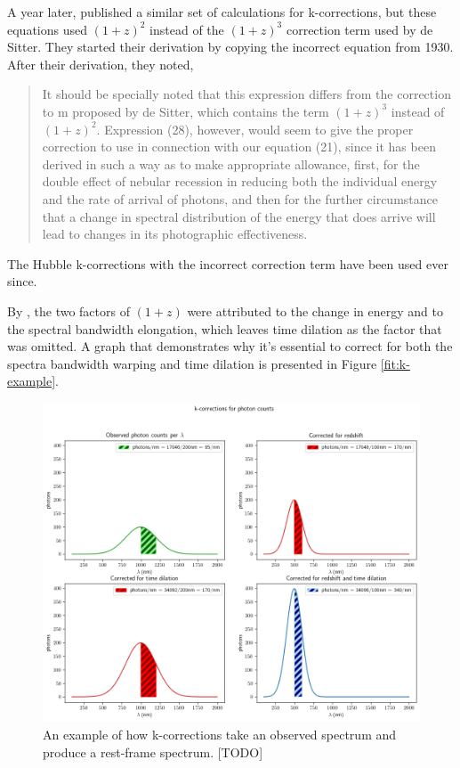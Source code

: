 \documentclass{article}
\begin{document}
A year later, \citet{hubble1935} published a similar set of calculations for
k-corrections, but these equations used $(1 + z)^2$ instead of the $(1 + z)^3$
correction term used by de Sitter. They started their derivation by copying the
incorrect equation from 1930. After their derivation, they noted,

\begin{quote}
It should be specially noted that this expression differs from the correction
to m proposed by de Sitter, which contains the term $(1 + z)^3$ instead of
$(1 + z)^2$. Expression (28), however, would seem to give the proper correction
to use in connection with our equation (21), since it has been derived in such
a way as to make appropriate allowance, first, for the double effect of nebular
recession in reducing both the individual energy and the rate of arrival of
photons, and then for the further circumstance that a change in spectral
distribution of the energy that does arrive will lead to changes in its
photographic effectiveness.
\end{quote}

The Hubble k-corrections with the incorrect correction term have been used ever
since.

By \citet{oke1968}, the two factors of $(1 + z)$ were attributed to the change
in energy and to the spectral bandwidth elongation, which leaves time dilation
as the factor that was omitted. A graph that demonstrates why it's essential to
correct for both the spectra bandwidth warping and time dilation is presented
in Figure \ref{fit:k-example}.

\begin{figure}[h]
  \includegraphics[width=\linewidth]{k-corrections_for_photon_counts.png}
  \caption{An example of how k-corrections take an observed spectrum and
  produce a rest-frame spectrum. [TODO]
  }
  \label{fig:k-example}
\end{figure}
\end{document}

